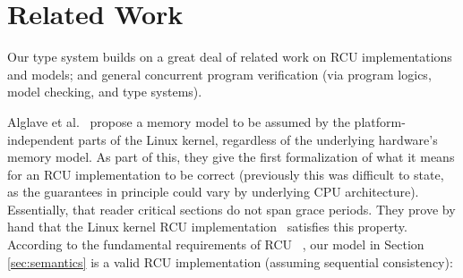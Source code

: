 \section{Related Work}
\label{sec:relatedwork}
Our type system builds on a great deal of related work on RCU implementations and models; and general concurrent program verification (via program logics, model checking, and type systems).

Alglave et al.~\cite{Alglave:2018:FSC:3173162.3177156} propose a memory model to be assumed by the platform-independent parts of the Linux kernel, regardless of the underlying hardware's memory model.
As part of this, they give the first formalization of what it means for an RCU implementation to be correct (previously this was difficult to state, as the guarantees in principle could vary by underlying CPU architecture). Essentially, that reader critical sections do not span grace periods. They prove by hand that the Linux kernel RCU implementation~\cite{DBLP:conf/cav/AlglaveKT13} satisfies this property. According to the fundamental requirements of \textsf{RCU} ~\cite{abssem}, our model in Section \ref{sec:semantics} is a valid RCU implementation (assuming sequential consistency):

